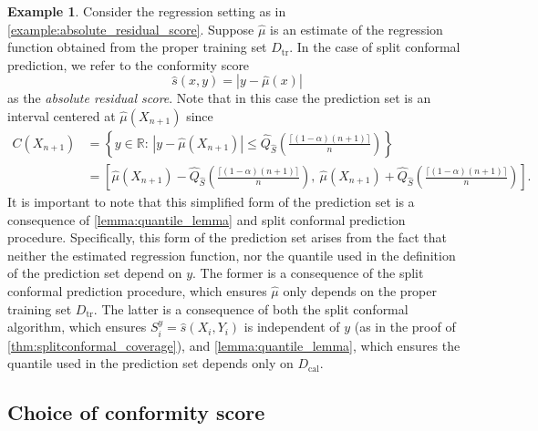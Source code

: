 \documentclass[11pt, titlepage]{article} %
\numberwithin{equation}{section}
\theoremstyle{definition}
\newtheorem{example}{Example}
\numberwithin{theorem}{section}
\numberwithin{lemma}{section}
\numberwithin{corollary}{section}
\numberwithin{proposition}{section}
\numberwithin{definition}{section}
\numberwithin{remark}{section}
\begin{document}
\begin{example}
Consider the regression setting as in \cref{example:absolute_residual_score}. Suppose \(\hat{\mu}\) is an estimate of the regression function obtained from the proper training set \(D_\mathrm{tr}\). In the case of split conformal prediction, we refer to the conformity score \[\hat{s}(x,y) = |y - \hat{\mu}(x)|\] as the \textit{absolute residual score}. Note that in this case the prediction set is an interval centered at \(\hat{\mu}(X_{n+1}) \) since \begin{align*}
    C(X_{n+1}) &= \left\{y \in \mathbb{R}: \, |y - \hat{\mu}(X_{n+1}) | \leq \hat{Q}_{\hat{S}} \left( \frac{\lceil (1-\alpha)(n+1) \rceil}{n} \right) \right\} \\
    &= \left[ \hat{\mu}(X_{n+1}) - \hat{Q}_{\hat{S}} \left( \frac{\lceil (1-\alpha)(n+1) \rceil}{n} \right), \ \hat{\mu}(X_{n+1}) + \hat{Q}_{\hat{S}} \left( \frac{\lceil (1-\alpha)(n+1) \rceil}{n} \right) \right].
\end{align*}
\noindent
It is important to note that this simplified form of the prediction set is a consequence of \cref{lemma:quantile_lemma} and split conformal prediction procedure. Specifically, this form of the prediction set arises from the fact that neither the estimated regression function, nor the quantile used in the definition of the prediction set depend on \(y\). The former is a consequence of the split conformal prediction procedure, which ensures \(\hat{\mu}\) only depends on the proper training set \(D_\mathrm{tr}\). The latter is a consequence of both the split conformal algorithm, which ensures \(S_i^y = \hat{s}(X_i, Y_i)\) is independent of \(y\) (as in the proof of \cref{thm:splitconformal_coverage}), and \cref{lemma:quantile_lemma}, which ensures the quantile used in the prediction set depends only on \(D_\mathrm{cal}\).

\end{example}


\subsection{Choice of conformity score}
\label{subsec:conformityscore}

\vfill \eject

%                                                                             
%                                                                             


\nocite{*}
\printbibliography

\end{document}
